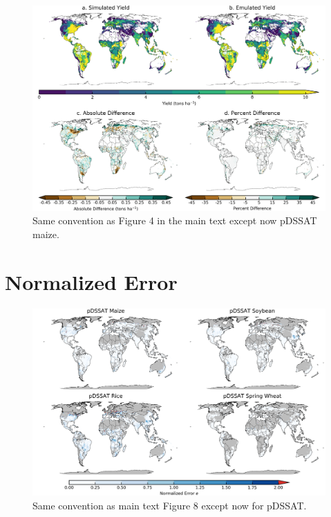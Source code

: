 \documentclass[10pt]{article}
\begin{document}
\begin{figure}[h!]
\includegraphics[width=\textwidth]{pdssat_maize.png}
\caption{Same convention as Figure 4 in the main text except now pDSSAT maize.}
\label{fig:lpjmlrice}
\end{figure}

\clearpage
\section{Normalized Error}

\begin{figure}[h!]
\centering
\includegraphics[width=15.5cm]{pDSSAT_spatial_error.png}
\caption{Same convention as main text Figure 8 except now for pDSSAT.}
\label{fig:pdssatnorm}
\end{figure}
\end{document}
